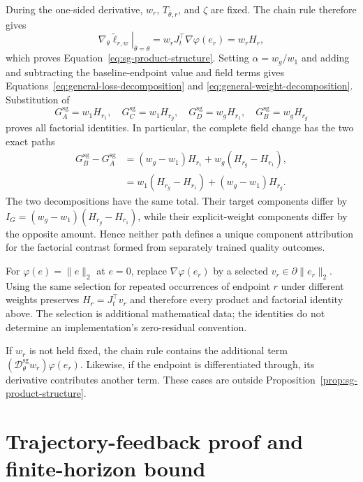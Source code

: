 \documentclass{article}
\newcommand{\Dsg}{\mathcal{D}^{\mathrm{sg}}_\theta}
\begin{document}
During the one-sided derivative, $w_r$, $T_{\bar\theta,r}$, and $\zeta$ are
fixed. The chain rule therefore gives
\begin{equation}
  \left.\nabla_\theta\widetilde\ell_{r,w}
  \right|_{\bar\theta=\theta}
  =w_rJ_t^\top\nabla\varphi(e_r)=w_rH_r,
\end{equation}
which proves Equation~\eqref{eq:sg-product-structure}. Setting
$\alpha=w_g/w_1$ and adding and subtracting the baseline-endpoint value and
field terms gives
Equations~\eqref{eq:general-loss-decomposition} and
\eqref{eq:general-weight-decomposition}. Substitution of
\begin{equation}
  G_A^{\mathrm{sg}}=w_1H_{r_1},\quad
  G_C^{\mathrm{sg}}=w_1H_{r_g},\quad
  G_D^{\mathrm{sg}}=w_gH_{r_1},\quad
  G_B^{\mathrm{sg}}=w_gH_{r_g}
\end{equation}
proves all factorial identities. In particular, the complete field change has
the two exact paths
\begin{align}
  G_B^{\mathrm{sg}}-G_A^{\mathrm{sg}}
  &=(w_g-w_1)H_{r_1}+w_g(H_{r_g}-H_{r_1}),\\
  &=w_1(H_{r_g}-H_{r_1})+(w_g-w_1)H_{r_g}.
\end{align}
The two decompositions have the same total. Their target components differ by
$I_G=(w_g-w_1)(H_{r_g}-H_{r_1})$, while their explicit-weight components differ
by the opposite amount. Hence neither path defines a unique component
attribution for the factorial contrast formed from separately trained quality
outcomes.

For $\varphi(e)=\lVert e\rVert_2$ at $e=0$, replace
$\nabla\varphi(e_r)$ by a selected $v_r\in\partial\lVert e_r\rVert_2$.
Using the same selection for repeated occurrences of endpoint $r$ under
different weights preserves $H_r=J_t^\top v_r$ and therefore every product and
factorial identity above. The selection is additional mathematical data; the
identities do not determine an implementation's zero-residual convention.

If $w_r$ is not held fixed, the chain rule contains the additional term
$(\Dsg w_r)\varphi(e_r)$. Likewise, if the endpoint is differentiated through,
its derivative contributes another term. These cases are outside
Proposition~\ref{prop:sg-product-structure}.

\section{Trajectory-feedback proof and finite-horizon bound}
\label{app:trajectory-proof}
\end{document}
